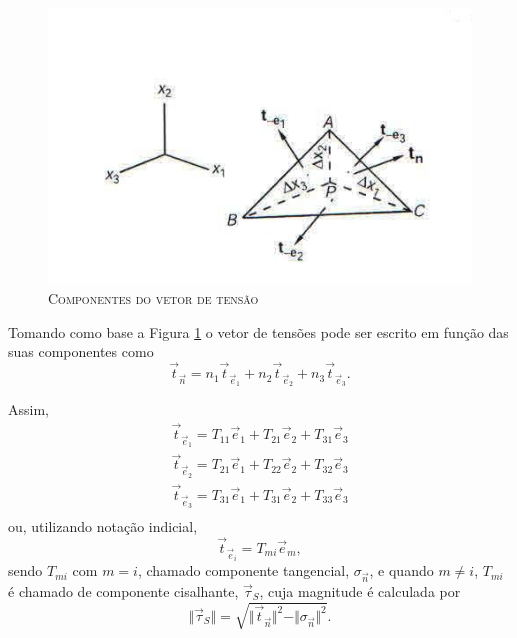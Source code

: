 \begin{figure}[H]%
	\centering
	\includegraphics[scale=1]{figuras/componentes_vetor_tensao.jpg}
	\caption{\textsc{Componentes do vetor de tensão}}
	\vspace{-0.1cm}
	\label{fig:compvetortensao}
\end{figure}

Tomando como base a Figura \ref{fig:compvetortensao} o vetor de tensões pode ser escrito em função das suas componentes como
\begin{equation}
	\vec{t} _{ \vec{n}} = n_{1} \vec{t} _{ \vec{e} _{1}} + n_{2} \vec{t} _{ \vec{e} _{2}} + n_{3} \vec{t} _{ \vec{e} _{3}}.
\end{equation}

Assim,
\begin{equation} \label{componente_vetor_tensao}
	\begin{array}{c}
		\vec{t} _{ \vec{e} _{1}} = T_{11} \vec{e} _{1} + T_{21} \vec{e} _{2} + T_{31} \vec{e} _{3}\\
		\vec{t} _{ \vec{e} _{2}} = T_{21} \vec{e} _{1} + T_{22} \vec{e} _{2} + T_{32} \vec{e} _{3}\\
		\vec{t} _{ \vec{e} _{3}} = T_{31} \vec{e} _{1} + T_{31} \vec{e} _{2} + T_{33} \vec{e} _{3}\\
	\end{array}
\end{equation}
ou, utilizando notação indicial,
\begin{equation}
	\vec{t} _{ \vec{e} _{i}} = T_{mi} \vec{e} _{m},
\end{equation}
sendo $ T_{mi} $ com $ m=i  $, chamado componente tangencial, $ \sigma _{ \vec{n}} $, e quando $ m \neq i  $, $ T_{mi} $ é chamado de componente cisalhante, $ \vec{\tau} _{S}$, cuja magnitude é calculada por
\begin{equation}
	\Vert \vec{\tau} _{S} \Vert = \sqrt{ \Vert \vec{t} _{ \vec{n}} \Vert ^{2} - \Vert \sigma _{ \vec{n}} \Vert ^{2}}.
\end{equation}

